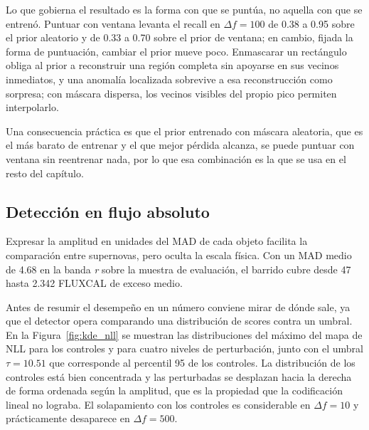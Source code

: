 Lo que gobierna el resultado es la forma con que se puntúa, no aquella con que se entrenó. Puntuar con ventana levanta el recall en $\Delta f = 100$ de 0.38 a 0.95 sobre el prior aleatorio y de 0.33 a 0.70 sobre el prior de ventana; en cambio, fijada la forma de puntuación, cambiar el prior mueve poco. Enmascarar un rectángulo obliga al prior a reconstruir una región completa sin apoyarse en sus vecinos inmediatos, y una anomalía localizada sobrevive a esa reconstrucción como sorpresa; con máscara dispersa, los vecinos visibles del propio pico permiten interpolarlo.

Una consecuencia práctica es que el prior entrenado con máscara aleatoria, que es el más barato de entrenar y el que mejor pérdida alcanza, se puede puntuar con ventana sin reentrenar nada, por lo que esa combinación es la que se usa en el resto del capítulo.

\subsection{Detección en flujo absoluto}

Expresar la amplitud en unidades del MAD de cada objeto facilita la comparación entre supernovas, pero oculta la escala física. Con un MAD medio de 4.68 en la banda \textit{r} sobre la muestra de evaluación, el barrido cubre desde 47 hasta 2.342 FLUXCAL de exceso medio.

Antes de resumir el desempeño en un número conviene mirar de dónde sale, ya que el detector opera comparando una distribución de scores contra un umbral. En la Figura~\ref{fig:kde_nll} se muestran las distribuciones del máximo del mapa de NLL para los controles y para cuatro niveles de perturbación, junto con el umbral $\tau = 10.51$ que corresponde al percentil 95 de los controles. La distribución de los controles está bien concentrada y las perturbadas se desplazan hacia la derecha de forma ordenada según la amplitud, que es la propiedad que la codificación lineal no lograba. El solapamiento con los controles es considerable en $\Delta f = 10$ y prácticamente desaparece en $\Delta f = 500$.

\begin{figure}[H]
\centering
{}
\end{figure}

